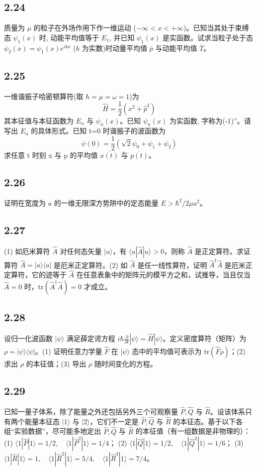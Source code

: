 \subsection{2.24}
质量为 $\mu$ 的粒子在外场作用下作一维运动 ($-\infty < x < +\infty$)。已知当其处于束缚态 $\psi_1(x)$ 时, 动能平均值等于 $E_1$, 并已知 $\psi_1(x)$ 是实函数。试求当粒子处于态 $\psi_2(x) = \psi_1(x) e^{ikx}$ ($k$ 为实数)时动量平均值 $\overline{p}$ 与动能平均值 $\overline{T}$。

\subsection{2.25}
一维谐振子哈密顿算符(取 $\hbar = \mu = \omega = 1$)为
$$\hat{H} = \frac{1}{2}(x^2 + \hat{p}^2)$$
其本征值与本征函数为 $E_n$ 与 $\psi_n(x)$。已知 $\psi_n(x)$ 为实函数, 字称为(-1)”。请写出 $E_n$ 的具体形式。已知 t=0 时谐振子的波函数为
$$\psi(0) = \frac{1}{2} \left( \sqrt{2}\psi_0 + \psi_1 + \psi_2 \right)$$
求任意 t 时刻 x 与 p 的平均值 $\overline{x(t)}$ 与 $\overline{p(t)}$。

\subsection{2.26}
证明在宽度为 $a$ 的一维无限深方势阱中的定态能量 $E > \hbar^2 / 2 \mu a^2$。

\subsection{2.27}
(1) 如厄米算符 $\hat{A}$ 对任何态矢量 $|u\rangle$，有 $\langle u|\hat{A}|u\rangle > 0$，则称 $\hat{A}$ 是正定算符。求证算符 $\hat{A} = |a\rangle \langle a|$ 是厄米正定算符。(2) 如 $\hat{A}$ 是任一线性算符，证明 $\hat{A}^{\dagger} \hat{A}$ 是厄米正定算符，它的迹等于 $\hat{A}$ 在任意表象中的矩阵元的模平方之和，试推导，当且仅当 $\hat{A} = 0$ 时，tr$(\hat{A}^{\dagger} \hat{A}) = 0$ 才成立。

\subsection{2.28}
设归一化波函数 $|\psi\rangle$ 满足薛定谔方程 $i \hbar \frac{\partial}{\partial t} |\psi\rangle = \hat{H} |\psi\rangle$。定义密度算符（矩阵）为 $\rho = |\psi\rangle \langle \psi|$。(1) 证明任意力学量 $\hat{F}$ 在 $|\psi\rangle$ 态中的平均值可表示为 tr$(\hat{F}\rho)$；(2) 求出 $\rho$ 的本征值；(3) 导出 $\rho$ 随时间变化的方程。

\subsection{2.29}
已知一量子体系，除了能量之外还包括另外三个可观察量 $\hat{P}, \hat{Q}$ 与 $\hat{R}$。设该体系只有两个能量本征态 $|1\rangle$ 与 $|2\rangle$，它们不一定是 $\hat{P}, \hat{Q}$ 与 $\hat{R}$ 的本征态。基于以下各组“实验数据”，尽可能多地定出 $\hat{P}, \hat{Q}$ 与 $\hat{R}$ 的本征值（有一组数据是非物理的）：
(1) $\langle 1|\hat{P}|1\rangle = 1/2, \quad \langle 1|\hat{P}^2|1\rangle = 1/4$；
(2) $\langle 1|\hat{Q}|1\rangle = 1/2, \quad \langle 1|\hat{Q}^2|1\rangle = 1/6$；
(3) $\langle 1|\hat{R}|1\rangle = 1, \quad \langle 1|\hat{R}^2|1\rangle = 5/4, \quad \langle 1|\hat{R}^3|1\rangle = 7/4$。

